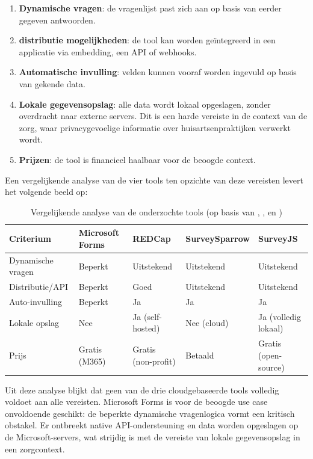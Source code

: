 \begin{enumerate}
  \item \textbf{Dynamische vragen}: de vragenlijst past zich aan op basis van eerder gegeven antwoorden.
  \item \textbf{distributie mogelijkheden}: de tool kan worden geïntegreerd in een applicatie via embedding, een API of webhooks.
  \item \textbf{Automatische invulling}: velden kunnen vooraf worden ingevuld op basis van gekende data.
  \item \textbf{Lokale gegevensopslag}: alle data wordt lokaal opgeslagen, zonder overdracht naar externe servers. Dit is een harde vereiste in de context van de zorg, waar privacygevoelige informatie over huisartsenpraktijken verwerkt wordt.
  \item \textbf{Prijzen}: de tool is financieel haalbaar voor de beoogde context.
\end{enumerate}

Een vergelijkende analyse van de vier tools ten opzichte van deze vereisten levert het volgende beeld op:

\begin{table}[h]
  \centering
  \begin{tabularx}{\textwidth}{|X|X|X|X|X|}
    \hline
    \textbf{Criterium} & \textbf{Microsoft Forms} & \textbf{REDCap} & \textbf{SurveySparrow} & \textbf{SurveyJS} \\
    \hline
    Dynamische vragen & Beperkt & Uitstekend & Uitstekend & Uitstekend \\
    \hline
    Distributie/API & Beperkt & Goed & Uitstekend & Uitstekend\\
    \hline
    Auto-invulling & Beperkt & Ja & Ja & Ja\\
    \hline
    Lokale opslag & Nee & Ja (self-hosted) & Nee (cloud) & Ja (volledig lokaal)\\
    \hline
    Prijs & Gratis (M365) & Gratis (non-profit) & Betaald & Gratis (open-source)\\
    \hline
  \end{tabularx}
  \label{tab:fit-analyse}
  \caption{Vergelijkende analyse van de onderzochte tools 
  (op basis van \textcite{surveyjs},
  \textcite{Harris2009},
  \textcite{microsoftForms} en
  \textcite{surveysparrow})}
\end{table}

Uit deze analyse blijkt dat geen van de drie cloudgebaseerde tools volledig voldoet aan alle vereisten. 
Microsoft Forms is voor de beoogde use case onvoldoende geschikt: 
de beperkte dynamische vragenlogica vormt een kritisch obstakel. 
Er ontbreekt native API-ondersteuning en data worden opgeslagen op de Microsoft-servers, 
wat strijdig is met de vereiste van lokale gegevensopslag in een zorgcontext.
\medskip

